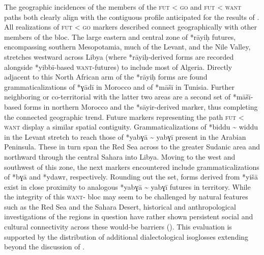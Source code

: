 \documentclass[output=paper]{langsci/langscibook}
\begin{document}
The geographic incidences of the members of the \textsc{fut} < \textsc{go} and \textsc{fut} < \textsc{want} paths both clearly align with the contiguous profile anticipated for the results of . All realizations of \textsc{fut} < \textsc{go}   markers described connect geographically with other members of the bloc. The large eastern and central zone of *rāyiḥ futures, encompassing southern Mesopotamia, much of the Levant, and the Nile Valley, stretches westward across Libya (where *rāyiḥ{}-derived forms are recorded alongside *yibbī-based \textsc{want}{}-futures) to include most of Algeria. Directly adjacent to this North African arm of the *rāyiḥ forms are found grammaticalizations of *ɣādī in Morocco and of *māšī in Tunisia. Further neighboring or co-territorial with the latter two areas are a second set of *māšī{}-based forms in northern Morocco and the  *sāyir-derived   marker, thus completing the connected geographic trend. Future markers representing the path \textsc{fut} < \textsc{want} display a similar spatial contiguity. Grammaticalizations of *biddu {\textasciitilde} widdu in the Levant stretch to reach those of *yabɣā {\textasciitilde} yabɣī present in the Arabian Peninsula. These in turn span the Red Sea across to the greater Sudanic area and northward through the central Sahara into Libya. Moving to the west and southwest of this zone, the next  markers encountered include grammaticalizations of *bɣā and *ydawr, respectively. Rounding out the set, forms derived from *yišā exist in close proximity to analogous *yabɣā {\textasciitilde} yabɣī futures in  territory. While the integrity of this \textsc{want}{}- bloc may seem to be challenged by natural features such as the Red Sea and the Sahara Desert, historical and anthropological investigations of the regions in question have rather shown persistent social and cultural connectivity across these would-be barriers (\citealt{Lydon2009,Power2012}). This evaluation is supported by the distribution of additional  dialectological isoglosses extending beyond the discussion of .
\end{document}
